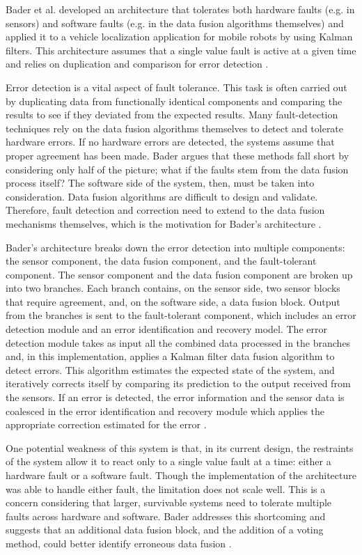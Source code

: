 \documentclass[twoside, conference]{IEEEtran}
\begin{document}
Bader et al. developed an architecture that tolerates both hardware faults (e.g. in sensors) and software faults (e.g. in the data fusion algorithms themselves) and applied it to a vehicle localization application for mobile robots by using Kalman filters. This architecture assumes that a single value fault is active at a given time and relies on duplication and comparison for error detection \cite{Bader2014}.

Error detection is a vital aspect of fault tolerance. This task is often carried out by duplicating data from functionally identical components and comparing the results to see if they deviated from the expected results. Many fault-detection techniques rely on the data fusion algorithms themselves to detect and tolerate hardware errors. If no hardware errors are detected, the systems assume that proper agreement has been made. Bader argues that these methods fall short by considering only half of the picture; what if the faults stem from the data fusion process itself? The software side of the system, then, must be taken into consideration. Data fusion algorithms are difficult to design and validate. Therefore, fault detection and correction need to extend to the data fusion mechanisms themselves, which is the motivation for Bader's architecture \cite{Bader2014}.

Bader's architecture breaks down the error detection into multiple components: the sensor component, the data fusion component, and the fault-tolerant component. The sensor component and the data fusion component are broken up into two branches. Each branch contains, on the sensor side, two sensor blocks that require agreement, and, on the software side, a data fusion block. Output from the branches is sent to the fault-tolerant component, which includes an error detection module and an error identification and recovery model. The error detection module takes as input all the combined data processed in the branches and, in this implementation, applies a Kalman filter data fusion algorithm to detect errors. This algorithm estimates the expected state of the system, and iteratively corrects itself by comparing its prediction to the output received from the sensors. If an error is detected, the error information and the sensor data is coalesced in the error identification and recovery module which applies the appropriate correction estimated for the error \cite{Bader2014}.

One potential weakness of this system is that, in its current design, the restraints of the system allow it to react only to a single value fault at a time: either a hardware fault or a software fault. Though the implementation of the architecture was able to handle either fault, the limitation does not scale well. This is a concern considering that larger, survivable systems need to tolerate multiple faults across hardware and software. Bader addresses this shortcoming and suggests that an additional data fusion block, and the addition of a voting method, could better identify erroneous data fusion \cite{Bader2014}.
\end{document}
